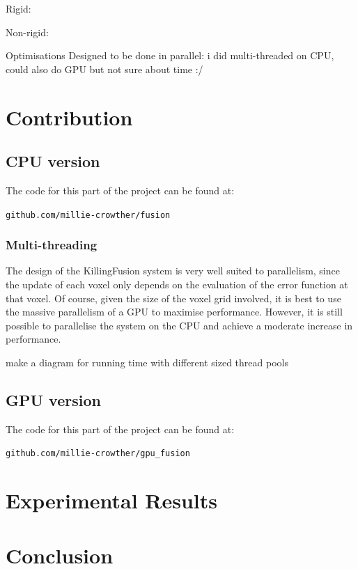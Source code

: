 \documentclass[12pt,twoside]{report}
\begin{document}
Rigid:

Non-rigid:

Optimisations
Designed to be done in parallel: i did multi-threaded on CPU, could also do GPU but not sure about time :/


\chapter{Contribution}

\section{CPU version}

The code for this part of the project can be found at:

\begin{center}
\verb|github.com/millie-crowther/fusion|
\end{center}

\subsection{Multi-threading}

The design of the KillingFusion system is very well suited to parallelism, since the update of each voxel only depends on the evaluation of the error function at that voxel. 
Of course, given the size of the voxel grid involved, it is best to use the massive parallelism of a GPU to maximise performance.
However, it is still possible to parallelise the system on the CPU and achieve a moderate increase in performance. 

make a diagram for running time with different sized thread pools

\section{GPU version}

The code for this part of the project can be found at:

\begin{center}
\verb|github.com/millie-crowther/gpu_fusion|
\end{center}


\chapter{Experimental Results}


\chapter{Conclusion}



\end{document}
